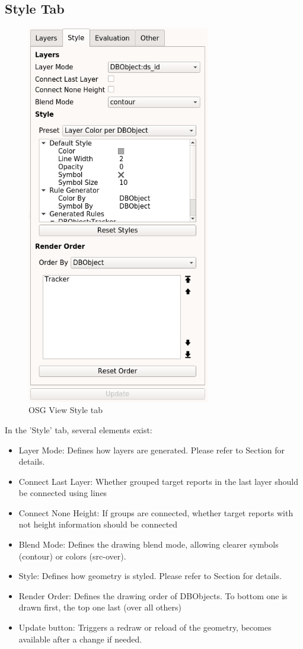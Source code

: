 \subsection{Style Tab}
\label{sec:osgview_style}

\begin{figure}[H]
   \center
    \includegraphics[width=8cm,frame]{../screenshots/osgview_style_tab.png}
  \caption{OSG View Style tab}
\end{figure}

In the 'Style' tab, several elements exist:

\begin{itemize}
 \item Layer Mode: Defines how layers are generated. Please refer to Section  for details.
 \item Connect Last Layer: Whether grouped target reports in the last layer should be connected using lines
 \item Connect None Height: If groups are connected, whether target reports with not height information should be connected
 \item Blend Mode: Defines the drawing blend mode, allowing clearer symbols (contour) or colors (src-over).
 \item Style: Defines how geometry is styled. Please refer to Section  for details.
 \item Render Order: Defines the drawing order of DBObjects. To bottom one is drawn first, the top one last (over all others)
 \item Update button: Triggers a redraw or reload of the geometry, becomes available after a change if needed.
\end{itemize} 

